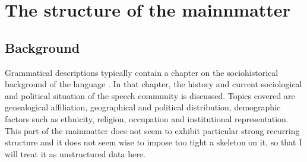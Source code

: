 \section{The structure of the mainnmatter}
\subsection{Background}
Grammatical descriptions typically contain a chapter on the sociohistorical background of the language \citep{Lehmann2002}. In that chapter, the history and current sociological and political situation of the speech community is discussed. Topics covered are genealogical affiliation, geographical and political distribution, demographic factors such as ethnicity, religion, occupation and institutional representation. This part of the mainmatter does not seem to exhibit particular strong recurring structure and it does not seem wise to impose too tight a skeleton on it, so that I will treat it as unstructured data here.

